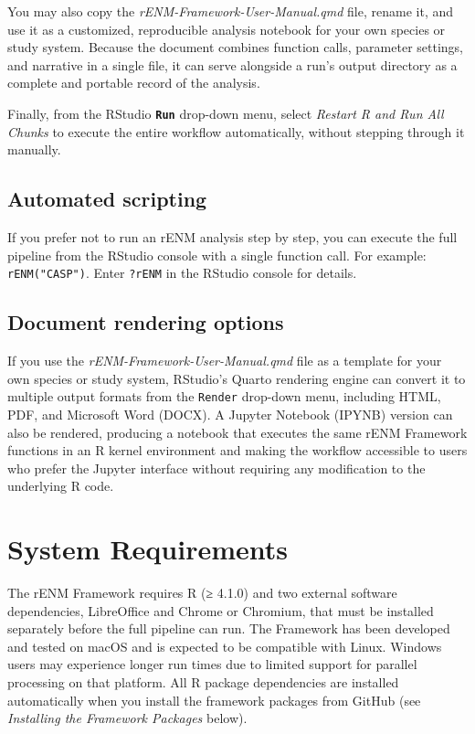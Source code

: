 \documentclass[
  letterpaper,
  DIV=11,
  numbers=noendperiod]{scrartcl}
\begin{document}
You may also copy the \emph{rENM-Framework-User-Manual.qmd} file, rename
it, and use it as a customized, reproducible analysis notebook for your
own species or study system. Because the document combines function
calls, parameter settings, and narrative in a single file, it can serve
alongside a run's output directory as a complete and portable record of
the analysis.

Finally, from the RStudio \textbf{\texttt{Run}} drop-down menu, select
\emph{Restart R and Run All Chunks} to execute the entire workflow
automatically, without stepping through it manually.

\subsection{Automated scripting}\label{automated-scripting}

If you prefer not to run an rENM analysis step by step, you can execute
the full pipeline from the RStudio console with a single function call.
For example: \texttt{rENM("CASP")}. Enter \texttt{?rENM} in the RStudio
console for details.

\subsection{Document rendering
options}\label{document-rendering-options}

If you use the \emph{rENM-Framework-User-Manual.qmd} file as a template
for your own species or study system, RStudio's Quarto rendering engine
can convert it to multiple output formats from the \texttt{Render}
drop-down menu, including HTML, PDF, and Microsoft Word (DOCX). A
Jupyter Notebook (IPYNB) version can also be rendered, producing a
notebook that executes the same rENM Framework functions in an R kernel
environment and making the workflow accessible to users who prefer the
Jupyter interface without requiring any modification to the underlying R
code.

\section{System Requirements}\label{system-requirements}

The rENM Framework requires R (≥ 4.1.0) and two external software
dependencies, LibreOffice and Chrome or Chromium, that must be installed
separately before the full pipeline can run. The Framework has been
developed and tested on macOS and is expected to be compatible with
Linux. Windows users may experience longer run times due to limited
support for parallel processing on that platform. All R package
dependencies are installed automatically when you install the framework
packages from GitHub (see \emph{Installing the Framework Packages}
below).
\end{document}
